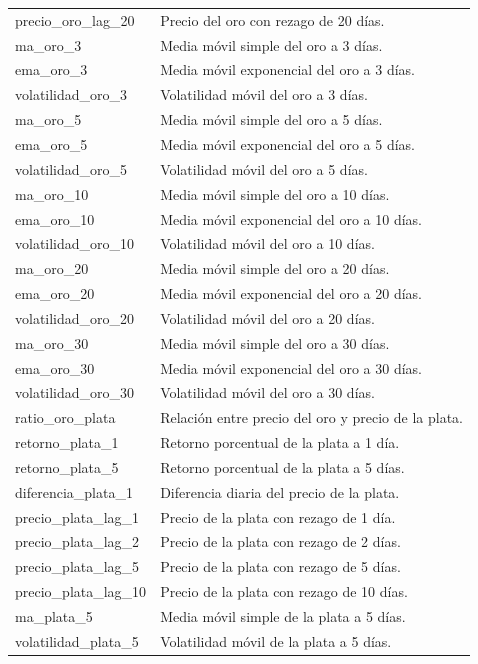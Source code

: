 \documentclass[12pt,letterpaper]{article}
\begin{document}
\begin{longtable}{p{4.2cm}p{10.2cm}}
precio\_oro\_lag\_20 & Precio del oro con rezago de 20 días. \\
ma\_oro\_3 & Media móvil simple del oro a 3 días. \\
ema\_oro\_3 & Media móvil exponencial del oro a 3 días. \\
volatilidad\_oro\_3 & Volatilidad móvil del oro a 3 días. \\
ma\_oro\_5 & Media móvil simple del oro a 5 días. \\
ema\_oro\_5 & Media móvil exponencial del oro a 5 días. \\
volatilidad\_oro\_5 & Volatilidad móvil del oro a 5 días. \\
ma\_oro\_10 & Media móvil simple del oro a 10 días. \\
ema\_oro\_10 & Media móvil exponencial del oro a 10 días. \\
volatilidad\_oro\_10 & Volatilidad móvil del oro a 10 días. \\
ma\_oro\_20 & Media móvil simple del oro a 20 días. \\
ema\_oro\_20 & Media móvil exponencial del oro a 20 días. \\
volatilidad\_oro\_20 & Volatilidad móvil del oro a 20 días. \\
ma\_oro\_30 & Media móvil simple del oro a 30 días. \\
ema\_oro\_30 & Media móvil exponencial del oro a 30 días. \\
volatilidad\_oro\_30 & Volatilidad móvil del oro a 30 días. \\
ratio\_oro\_plata & Relación entre precio del oro y precio de la plata. \\
retorno\_plata\_1 & Retorno porcentual de la plata a 1 día. \\
retorno\_plata\_5 & Retorno porcentual de la plata a 5 días. \\
diferencia\_plata\_1 & Diferencia diaria del precio de la plata. \\
precio\_plata\_lag\_1 & Precio de la plata con rezago de 1 día. \\
precio\_plata\_lag\_2 & Precio de la plata con rezago de 2 días. \\
precio\_plata\_lag\_5 & Precio de la plata con rezago de 5 días. \\
precio\_plata\_lag\_10 & Precio de la plata con rezago de 10 días. \\
ma\_plata\_5 & Media móvil simple de la plata a 5 días. \\
volatilidad\_plata\_5 & Volatilidad móvil de la plata a 5 días. \\

\end{longtable}
\end{document}
